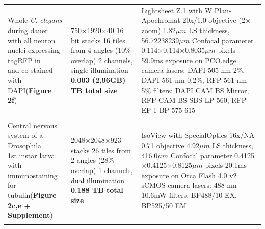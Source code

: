 \documentclass[]{spie}  %
\begin{document}
\begin{landscape}
{\begin{longtable}{lll}
                              \makecell[l]{Whole \emph{C. elegans} during dauer \\with all neuron nuclei expressing tagRFP in \\and co-stained with DAPI(\textbf{Figure 2f})} &  \makecell[l]{750$\times$1920$\times$40 16 bit stacks\\16 tiles from 4 angles (10\% overlap) \\2 channels, single illumination\\\textbf{0.003 (2,96GB) TB total size}}  &  \makecell[l]{Lightsheet Z.1 with W Plan-Apochromat 20x/1.0 objective (2$\times$ zoom)\\1.82$\mu{}m$ LS thickness, 56.72238239$\mu{}m$ Confocal parameter\\0.114$\times$0.114$\times$0.8035$\mu{}m$ pixels\\59.9ms exposure on PCO.edge camera\\lasers: DAPI 505 nm 2\%, DAPI 561 nm 0.2\%, RFP 561 nm 5\%\\filters: DAPI CAM BS Mirror, RFP CAM BS SBS LP 560, RFP EF 1 BP 575-615} \\ \\
                          \makecell[l]{Central nervous system of a Drosophila\\ 1st instar larva with immunostaining \\for tubulin(\textbf{Figure 2c,e + Supplement})} &                     \makecell[l]{2048$\times$2048$\times$923 stacks\\26 tiles from 2 angles (28\% overlap) \\1 channels, dual illumination\\\textbf{0.188 TB total size}}  &                                                                                                                \makecell[l]{IsoView with SpecialOptics 16x/NA 0.71 objective \\4.92$\mu{}m$ LS thickness, 416.0$\mu{}m$ Confocal parameter\\0.4125$\times$0.4125$\times$0.8125$\mu{}m$ pixels\\20.1ms exposure on Orca Flash 4.0 v2 sCMOS camera\\lasers: 488 nm 10.6mW\\filters: BP488/10 EX, BP525/50 EM } \\ \\
\end{longtable}}

\pagebreak

\captionsetup{singlelinecheck = false, format=plain, justification=justified, labelsep=space}


\end{landscape}
\end{document}
